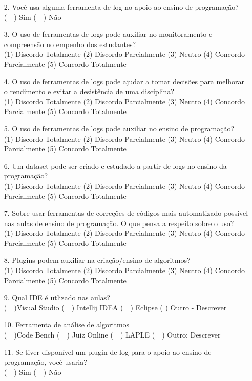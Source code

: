 \begin{enumerate}
    \item[2.] Você usa alguma ferramenta de log no apoio ao ensino de programação? \\ (~~) Sim (~~) Não
    \item[3.] O uso de ferramentas de logs pode auxiliar no monitoramento e compreensão no empenho dos estudantes?  \\
    (1) Discordo Totalmente (2) Discordo Parcialmente (3) Neutro (4) Concordo Parcialmente (5) Concordo Totalmente
    \item[4.] O uso de ferramentas de logs pode ajudar a tomar decisões para melhorar o rendimento e evitar a desistência de uma disciplina? \\
    (1) Discordo Totalmente (2) Discordo Parcialmente (3) Neutro (4) Concordo Parcialmente (5) Concordo Totalmente
    \item[5.] O uso de ferramentas de logs pode auxiliar no ensino de programação? \\
    (1) Discordo Totalmente (2) Discordo Parcialmente (3) Neutro (4) Concordo Parcialmente (5) Concordo Totalmente
    \item[6.] Um dataset pode ser criado e estudado a partir de logs no ensino da programação? \\
    (1) Discordo Totalmente (2) Discordo Parcialmente (3) Neutro (4) Concordo Parcialmente (5) Concordo Totalmente
    \item[7.] Sobre usar ferramentas de correções de códigos mais automatizado possível nas aulas de ensino de programação. O que pensa a respeito sobre o uso? \\
    (1) Discordo Totalmente (2) Discordo Parcialmente (3) Neutro (4) Concordo Parcialmente (5) Concordo Totalmente
    \item[8.] Plugins podem auxiliar na criação/ensino  de algoritmos? \\
    (1) Discordo Totalmente (2) Discordo Parcialmente (3) Neutro (4) Concordo Parcialmente (5) Concordo Totalmente
    \item[9.] Qual IDE é utlizado nas aulas? \\ (~~)Visual Studio (~~) Intellij IDEA (~~) Eclipse ( ) Outro - Descrever
    \item[10.] Ferramenta de análise de algoritmos \\ (~~)Code Bench (~~) Juiz Online (~~) LAPLE (~~) Outro: Descrever
    \item[11.] Se tiver disponível um plugin de log para o apoio ao ensino de programação, você usaria? \\ (~~) Sim (~~) Não
\end{enumerate}

